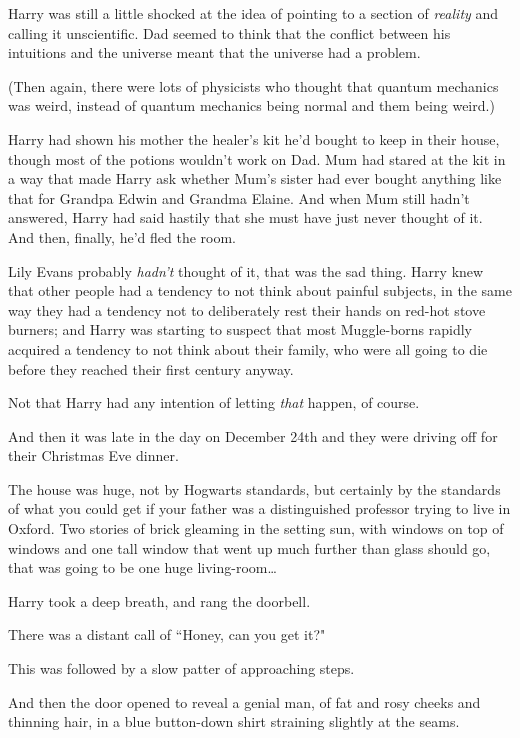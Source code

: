 Harry was still a little shocked at the idea of pointing to a section of \emph{reality} and calling it unscientific. Dad seemed to think that the conflict between his intuitions and the universe meant that the universe had a problem.

(Then again, there were lots of physicists who thought that quantum mechanics was weird, instead of quantum mechanics being normal and them being weird.)

Harry had shown his mother the healer's kit he'd bought to keep in their house, though most of the potions wouldn't work on Dad. Mum had stared at the kit in a way that made Harry ask whether Mum's sister had ever bought anything like that for Grandpa Edwin and Grandma Elaine. And when Mum still hadn't answered, Harry had said hastily that she must have just never thought of it. And then, finally, he'd fled the room.

Lily Evans probably \emph{hadn't} thought of it, that was the sad thing. Harry knew that other people had a tendency to not think about painful subjects, in the same way they had a tendency not to deliberately rest their hands on red-hot stove burners; and Harry was starting to suspect that most Muggle-borns rapidly acquired a tendency to not think about their family, who were all going to die before they reached their first century anyway.

Not that Harry had any intention of letting \emph{that} happen, of course.

And then it was late in the day on December 24th and they were driving off for their Christmas Eve dinner.

\later

The house was huge, not by Hogwarts standards, but certainly by the standards of what you could get if your father was a distinguished professor trying to live in Oxford. Two stories of brick gleaming in the setting sun, with windows on top of windows and one tall window that went up much further than glass should go, that was going to be one huge living-room…

Harry took a deep breath, and rang the doorbell.

There was a distant call of ``Honey, can you get it?"

This was followed by a slow patter of approaching steps.

And then the door opened to reveal a genial man, of fat and rosy cheeks and thinning hair, in a blue button-down shirt straining slightly at the seams.

